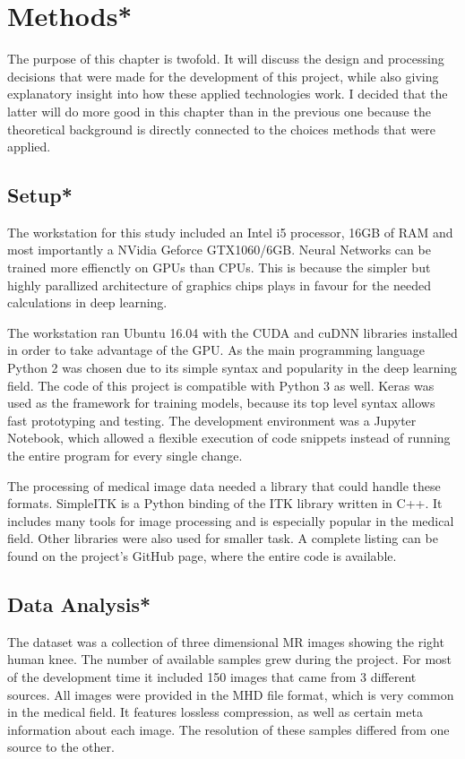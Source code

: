 \section{Methods*}

The purpose of this chapter is twofold. It will discuss the design and processing decisions that were made for the development of this project, while also giving explanatory insight into how these applied technologies work. I decided that the latter will do more good in this chapter than in the previous one because the theoretical background is directly connected to the choices methods that were applied.

\subsection{Setup*}

The workstation for this study included an Intel i5 processor, 16GB of RAM and most importantly a NVidia Geforce GTX1060/6GB. Neural Networks can be trained more effienctly on GPUs than CPUs. This is because the simpler but highly parallized architecture of graphics chips plays in favour for the needed calculations in deep learning.

The workstation ran Ubuntu 16.04 with the CUDA and cuDNN libraries installed in order to take advantage of the GPU. As the main programming language Python 2 was chosen due to its simple syntax and popularity in the deep learning field. The code of this project is compatible with Python 3 as well. Keras was used as the framework for training models, because its top level syntax allows fast prototyping and testing. The development environment was a Jupyter Notebook, which allowed a flexible execution of code snippets instead of running the entire program for every single change.

The processing of medical image data needed a library that could handle these formats. SimpleITK is a Python binding of the ITK library written in C++. It includes many tools for image processing and is especially popular in the medical field. Other libraries were also used for smaller task. A complete listing can be found on the project's GitHub page, where the entire code is available.

\subsection{Data Analysis*}

The dataset was a collection of three dimensional MR images showing the right human knee. The number of available samples grew during the project. For most of the development time it included 150 images that came from 3 different sources. All images were provided in the MHD file format, which is very common in the medical field. It features lossless compression, as well as certain meta information about each image. The resolution of these samples differed from one source to the other.

